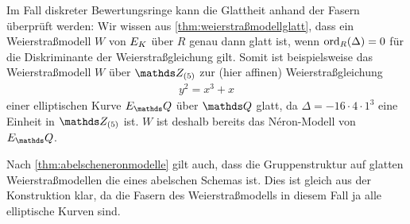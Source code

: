 \begin{Bemerkung}
  Im Fall diskreter Bewertungsringe kann die Glattheit anhand der Fasern
  überprüft werden:
  Wir wissen aus \ref{thm:weierstraßmodellglatt},
  dass ein Weierstraßmodell $W$ von $E_{K}$ über $R$ genau dann glatt
  ist, wenn $\operatorname{ord}_R(\Delta)=0$ für die Diskriminante der
  Weierstraßgleichung gilt.
  Somit ist beispielsweise das Weierstraßmodell $W$ über $\Z_{(5)}$
  zur (hier affinen) Weierstraßgleichung
  \begin{gather*}
    y^2=x^3+x
  \end{gather*}
  einer elliptischen Kurve $E_\Q$ über $\Q$ glatt, da
  $\Delta=-16\cdot4\cdot1^3$ eine Einheit in $\Z_{(5)}$ ist.
  $W$ ist deshalb bereits das Néron-Modell von $E_\Q$.

  Nach \ref{thm:abelscheneronmodelle} gilt auch, dass die
  Gruppenstruktur auf glatten Weierstraßmodellen die eines abelschen
  Schemas ist.
  Dies ist gleich aus der Konstruktion klar, da die Fasern des
  Weierstraßmodells in diesem Fall ja alle elliptische Kurven sind.
\end{Bemerkung}

